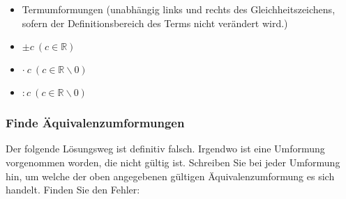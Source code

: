 \begin{itemize}
	\item Termumformungen (unabhängig links und rechts des Gleichheitszeichens, sofern der Definitionsbereich des Terms nicht verändert wird.)
	\item $\pm    c\ (c \in \mathbb{R})$
	\item $\cdot\ c\ (c \in \mathbb{R}\backslash 0)$
	\item $:      c\ (c \in \mathbb{R}\backslash 0)$
\end{itemize}
\newpage

\subsubsection{Finde Äquivalenzumformungen}
Der folgende Lösungsweg ist definitiv falsch. Irgendwo ist eine Umformung vorgenommen worden, die nicht gültig ist.
Schreiben Sie bei jeder Umformung hin, um welche der oben angegebenen gültigen Äquivalenzumformung es sich handelt. Finden Sie den Fehler:

